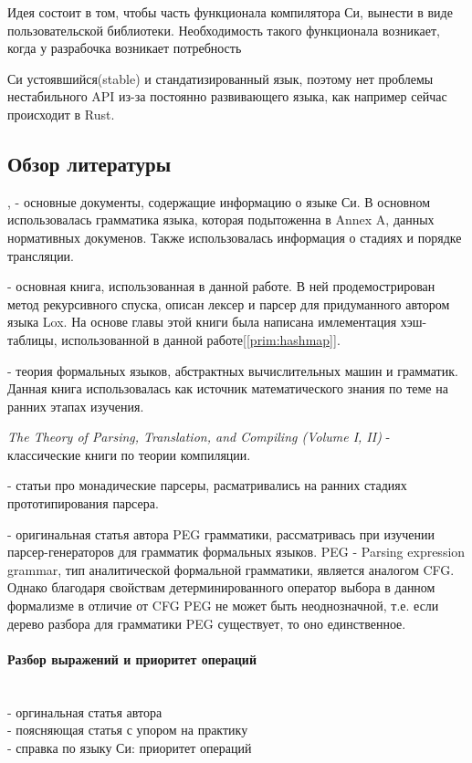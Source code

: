 Идея состоит в том, чтобы часть функционала компилятора Си, вынести в виде пользовательской библиотеки.
Необходимость такого функционала возникает, когда у разрабочка возникает потребность 

Си устоявшийся(stable) и стандатизированный язык, 
поэтому нет проблемы нестабильного API из-за постоянно развивающего языка, как например сейчас происходит в Rust.


\subsection*{Обзор литературы}

,  - основные документы, содержащие информацию о языке Си.
В основном использовалась грамматика языка, которая подытоженна в Annex A, данных нормативных докуменов. 
Также использовалась информация о стадиях и порядке трансляции.

 - основная книга, использованная в данной работе. 
В ней продемострирован метод рекурсивного спуска, описан лексер и парсер для придуманного автором языка Lox.
На основе главы этой книги была написана имлементация хэш-таблицы, использованной в данной работе[\ref{prim:hashmap}].

 - теория формальных языков, абстрактных вычислительных машин и грамматик. 
Данная книга использовалась как источник математического знания по теме на ранних этапах изучения.

\textit{The Theory of Parsing, Translation, and Compiling (Volume I, II)}
\cite{ptc_vI} \cite{ptc_vII} - классические книги по теории компиляции.

 - статьи про монадические парсеры, расматривались на ранних стадиях прототипирования парсера.

 - оригинальная статья автора PEG грамматики, 
рассматривась при изучении парсер-генераторов для грамматик формальных языков.
PEG - Parsing expression grammar, тип аналитической формальной грамматики, является аналогом CFG. 
Однако благодаря свойствам детерминированного оператор выбора в данном формализме в отличие от CFG PEG не может быть неоднозначной, 
т.е. если дерево разбора для грамматики PEG существует, то оно единственное.

\paragraph{Разбор выражений и приоритет операций}
\label{litover:pratt} \mbox{} \\
 - оргинальная статья автора \\
 - поясняющая статья с упором на практику \\
 - справка по языку Си: приоритет операций \\

